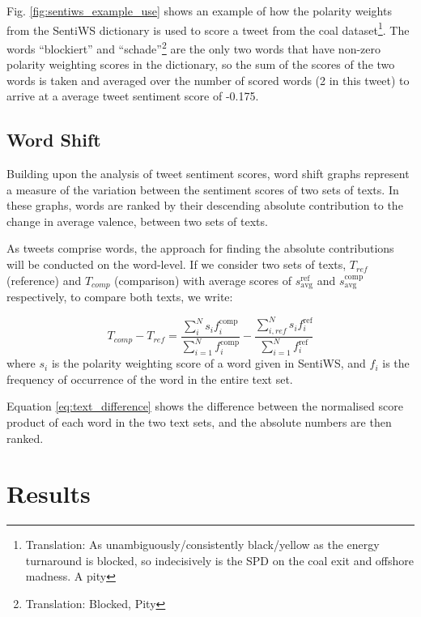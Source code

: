 \documentclass[12pt,onecolumn,twoside]{layout}
\begin{document}
Fig. \ref{fig:sentiws_example_use} shows an example of how the polarity weights from the SentiWS dictionary is used to score a tweet from the coal dataset\footnote{Translation: As unambiguously/consistently black/yellow as the energy turnaround is blocked, so indecisively is the SPD on the coal exit and offshore madness. A pity}. The words ``blockiert'' and ``schade''\footnote{Translation: Blocked, Pity} are the only two words that have non-zero polarity weighting scores in the dictionary, so the sum of the scores of the two words is taken and averaged over the number of scored words (2 in this tweet) to arrive at a average tweet sentiment score of -0.175. 

\subsection*{Word Shift}
Building upon the analysis of tweet sentiment scores, word shift graphs represent a measure of the variation between the sentiment scores of two sets of texts. In these graphs, words are ranked by their descending absolute contribution to the change in average valence, between two sets of texts. 

As tweets comprise words, the approach for finding the absolute contributions will be conducted on the word-level. If we consider two sets of texts, \(T_{ref}\) (reference) and \(T_{comp}\) (comparison) with average scores of \(s_{\text{avg}}^{\text{ref}}\) and \(s_{\text{avg}}^{\text{comp}}\) respectively, to compare both texts, we write: 

\begin{equation}
\label{eq:text_difference}
T_{comp} - T_{ref} = \frac{\sum_{i}^{N} s_i f_i^{\text{comp}}}{\sum_{i=1}^{N} f_i^{\text{comp}}} - \frac{\sum_{i,ref}^{N} s_i f_i^{\text{ref}}}{\sum_{i=1}^{N} f_i^{\text{ref}}}
\end{equation} 	
where \(s_i\) is the polarity weighting score of a word given in SentiWS, and \(f_i\) is the frequency of occurrence of the word in the entire text set. 

Equation \ref{eq:text_difference} shows the difference between the normalised score product of each word in the two text sets, and the absolute numbers are then ranked. 

 

\section{Results} \label{sec:results}
\end{document}
